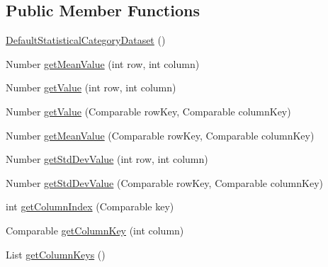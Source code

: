 \subsection*{Public Member Functions}
\begin{DoxyCompactItemize}
\item 
\mbox{\hyperlink{classorg_1_1jfree_1_1data_1_1statistics_1_1_default_statistical_category_dataset_a1c770d48ebf09d81d8df634eb53d94da}{Default\+Statistical\+Category\+Dataset}} ()
\item 
Number \mbox{\hyperlink{classorg_1_1jfree_1_1data_1_1statistics_1_1_default_statistical_category_dataset_ae496e2b111f9a639e035e06643777232}{get\+Mean\+Value}} (int row, int column)
\item 
Number \mbox{\hyperlink{classorg_1_1jfree_1_1data_1_1statistics_1_1_default_statistical_category_dataset_a47a00a30734d34a1d7664f5cc077b277}{get\+Value}} (int row, int column)
\item 
Number \mbox{\hyperlink{classorg_1_1jfree_1_1data_1_1statistics_1_1_default_statistical_category_dataset_abd1e47cb280bcac4a251fcc160953f58}{get\+Value}} (Comparable row\+Key, Comparable column\+Key)
\item 
Number \mbox{\hyperlink{classorg_1_1jfree_1_1data_1_1statistics_1_1_default_statistical_category_dataset_a7ce65a6f83222b7b2a709855a9feb470}{get\+Mean\+Value}} (Comparable row\+Key, Comparable column\+Key)
\item 
Number \mbox{\hyperlink{classorg_1_1jfree_1_1data_1_1statistics_1_1_default_statistical_category_dataset_a09ad7dd078ff3965d5a7f66a86e8dcbc}{get\+Std\+Dev\+Value}} (int row, int column)
\item 
Number \mbox{\hyperlink{classorg_1_1jfree_1_1data_1_1statistics_1_1_default_statistical_category_dataset_a5e3534fe65d917d61794a94a4287556f}{get\+Std\+Dev\+Value}} (Comparable row\+Key, Comparable column\+Key)
\item 
int \mbox{\hyperlink{classorg_1_1jfree_1_1data_1_1statistics_1_1_default_statistical_category_dataset_af2dfd30fc9a145d8371467b02b269dc3}{get\+Column\+Index}} (Comparable key)
\item 
Comparable \mbox{\hyperlink{classorg_1_1jfree_1_1data_1_1statistics_1_1_default_statistical_category_dataset_ada7e3476ceb52c6ad531e49297cdfbc9}{get\+Column\+Key}} (int column)
\item 
List \mbox{\hyperlink{classorg_1_1jfree_1_1data_1_1statistics_1_1_default_statistical_category_dataset_a7b6adfe3285ed140fc188ab1dbd154d7}{get\+Column\+Keys}} ()
\item 

\end{DoxyCompactItemize}
